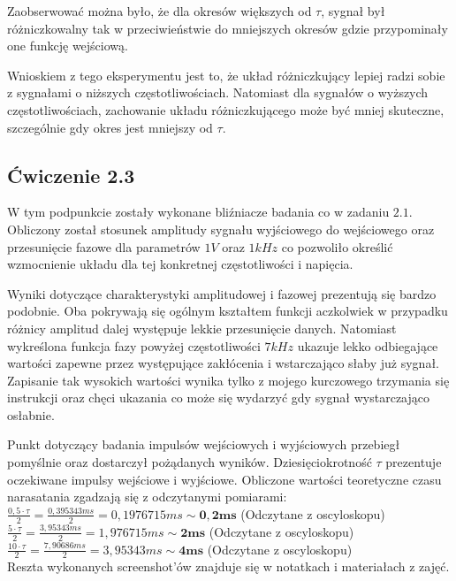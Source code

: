 \documentclass{article}
\begin{document}
      Zaobserwować można było, że dla okresów większych od $\tau$, sygnał był różniczkowalny tak w przeciwieństwie do mniejszych okresów gdzie przypominały one funkcję wejściową.
    
      Wnioskiem z tego eksperymentu jest to, że układ różniczkujący lepiej radzi sobie z sygnałami o niższych częstotliwościach. Natomiast dla sygnałów o wyższych częstotliwościach, zachowanie układu różniczkującego może być mniej skuteczne, szczególnie gdy okres jest mniejszy od $\tau$.

    \subsection{Ćwiczenie 2.3}
      W tym podpunkcie zostały wykonane bliźniacze badania co w zadaniu $2.1$. Obliczony został stosunek amplitudy sygnału wyjściowego do wejściowego oraz przesunięcie fazowe dla parametrów $1V$ oraz $1kHz$ co pozwoliło określić wzmocnienie układu dla tej konkretnej częstotliwości i napięcia.

      Wyniki dotyczące charakterystyki amplitudowej i fazowej prezentują się bardzo podobnie. Oba pokrywają się ogólnym kształtem funkcji aczkolwiek w przypadku różnicy amplitud dalej występuje lekkie przesunięcie danych. Natomiast wykreślona funkcja fazy powyżej częstotliwości $7kHz$ ukazuje lekko odbiegające wartości zapewne przez występujące zakłócenia i wstarczająco słaby już sygnał. Zapisanie tak wysokich wartości wynika tylko z mojego kurczowego trzymania się instrukcji oraz chęci ukazania co może się wydarzyć gdy sygnał wystarczająco osłabnie.

      Punkt dotyczący badania impulsów wejściowych i wyjściowych przebiegł pomyślnie oraz dostarczył pożądanych wyników. Dziesięciokrotność $\tau$ prezentuje oczekiwane impulsy wejściowe i wyjściowe. Obliczone wartości teoretyczne czasu narasatania zgadzają się z odczytanymi pomiarami: \\
      $\frac{0,5 \cdot \tau}{2}  = \frac{0,395343 ms}{2} = 0,1976715 ms \sim \mathbf{0,2ms}$ (Odczytane z oscyloskopu) \\
      $\frac{5 \cdot \tau}{2}  = \frac{3,95343 ms}{2} = 1,976715 ms \sim \mathbf{2ms}$ (Odczytane z oscyloskopu) \\
      $\frac{10 \cdot \tau}{2}  = \frac{7,90686 ms}{2} = 3,95343 ms \sim \mathbf{4ms}$ (Odczytane z oscyloskopu) \\

      Reszta wykonanych screenshot'ów znajduje się w notatkach i materiałach z zajęć.
\end{document}
